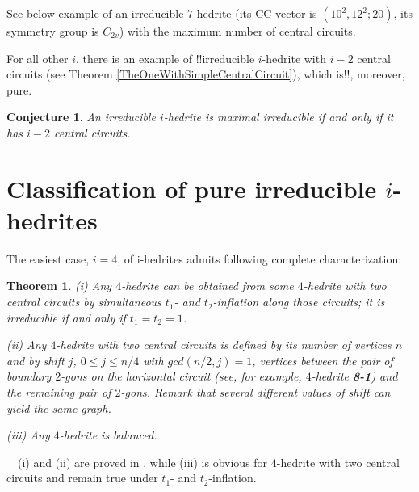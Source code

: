 \documentclass[12pt]{article}
\newtheorem{theorem}{Theorem}
\newtheorem{conjecture}{Conjecture}
\newcommand{\proof}{\noindent{\bf Proof.}\ \ }
\begin{document}
See below example of an irreducible $7$-hedrite (its CC-vector is $(10^2, 12^2; 20)$, its symmetry group is $C_{2v}$) with the maximum number of central circuits.


\begin{center}
\epsfxsize=60mm
\end{center}

For all other $i$, there is an example of !!irreducible $i$-hedrite with $i-2$ central circuits (see 
Theorem \ref{TheOneWithSimpleCentralCircuit}), which is!!, moreover, pure.















\begin{conjecture}
An irreducible $i$-hedrite is maximal irreducible if and only if it has $i-2$ central circuits.
\end{conjecture}



\section{Classification of pure irreducible $i$-hedrites}
The easiest case, $i=4$, of i-hedrites admits following complete
characterization:

\begin{theorem}\label{Theorem-for-4-hedrite}
(i) Any $4$-hedrite can be obtained from some $4$-hedrite with two central
circuits by simultaneous $t_1$- and $t_2$-inflation along those circuits; it is
irreducible if and only if $t_1=t_2=1$.

(ii) Any $4$-hedrite with two central circuits is defined by
its number of vertices $n$ and by {\em shift} $j$, $0 \le j \le n/4$
with $gcd(n/2, j)=1$,
vertices between the pair of boundary $2$-gons on the horizontal
circuit (see, for example, $4$-hedrite {\bf 8-1}) and the remaining
pair of $2$-gons. Remark that several different values of shift can yield
the same graph.

(iii) Any $4$-hedrite is balanced.

\end{theorem}
\proof (i) and (ii) are proved in \cite{DSt}, 
while (iii) is obvious for $4$-hedrite with two central circuits
and remain true under $t_1$- and $t_2$-inflation.
\end{document}
